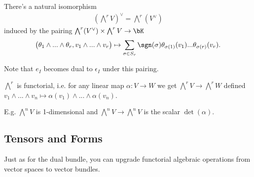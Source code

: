 \begin{lem}\label{lem:lec2.40}
	There's a natural isomorphism
	\begin{align*}
		\left(\bigwedge^r V\right)^\vee = \bigwedge^r(V^\vee)
	\end{align*}
	induced by the pairing $\bigwedge^r(V^\vee) \times \bigwedge^rV \to \bK$
	\begin{align*}
		\big(\theta_1\wedge...\wedge\theta_r,v_1\wedge...\wedge v_r\big) \mapsto \sum_{\sigma \in S_r} \sgn(\sigma) \theta_{\sigma(1)}(v_1)...\theta_{\sigma(r)}(v_r).
	\end{align*}
\end{lem}
Note that $e_I$ becomes dual to $\epsilon_I$ under this pairing.
\begin{lem}\label{lem:lec2.41}
	$\bigwedge^r$ is functorial, i.e. for any linear map $\alpha:V\to W$ we get $\bigwedge^r V\to \bigwedge^r W$ defined $v_1\wedge...\wedge v_n \mapsto \alpha(v_1) \wedge...\wedge \alpha(v_n)$.

	E.g. $\bigwedge^n V$ is 1-dimensional and $\bigwedge^n V \to \bigwedge^n V$ is the scalar $\det(\alpha)$.
\end{lem}

\subsection{Tensors and Forms}

Just as for the dual bundle, you can upgrade functorial algebraic operations from vector spaces to vector bundles.

